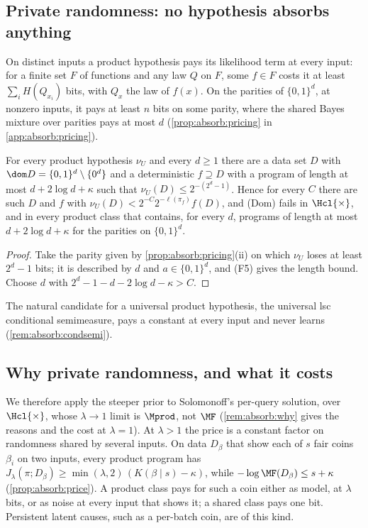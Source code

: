 \subsection{Private randomness: no hypothesis absorbs anything}\label{sec:absorb:private}

On distinct inputs a product hypothesis pays its likelihood term at every input: for a finite set $F$ of functions and any law $Q$ on $F$, some $f\in F$ costs it at least $\sum_iH(Q_{x_i})$ bits, with $Q_x$ the law of $f(x)$. On the parities of $\{0,1\}^d$, at nonzero inputs, it pays at least $n$ bits on some parity, where the shared Bayes mixture over parities pays at most $d$ (\cref{prop:absorb:pricing} in \cref{app:absorb:pricing}).

\begin{corollary}\label{cor:absorb:nouniversal}
For every product hypothesis $\nu_U$ and every $d\ge1$ there are a data set $D$ with $\dom D=\{0,1\}^d\setminus\{0^d\}$ and a deterministic $f\supseteq D$ with a program of length at most $d+2\log d+\kappa$ such that $\nu_U(D)\le2^{-(2^d-1)}$. Hence for every $C$ there are such $D$ and $f$ with $\nu_U(D)<2^{-C}2^{-\ell(\pi_f)}f(D)$, and (Dom) fails in $\Hcl{\times}$, and in every product class that contains, for every $d$, programs of length at most $d+2\log d+\kappa$ for the parities on $\{0,1\}^d$.
\end{corollary}

\begin{proof}
Take the parity given by \cref{prop:absorb:pricing}(ii) on which $\nu_U$ loses at least $2^d-1$ bits; it is described by $d$ and $a\in\{0,1\}^d$, and (F5) gives the length bound. Choose $d$ with $2^d-1-d-2\log d-\kappa>C$.
\end{proof}

The natural candidate for a universal product hypothesis, the universal lsc conditional semimeasure, pays a constant at every input and never learns (\cref{rem:absorb:condsemi}).

\subsection{Why private randomness, and what it costs}\label{sec:absorb:price}

We therefore apply the steeper prior to Solomonoff's per-query solution, over $\Hcl{\times}$, whose $\lambda\to1$ limit is $\Mprod$, not $\MF$ (\cref{rem:absorb:why} gives the reasons and the cost at $\lambda=1$). At $\lambda>1$ the price is a constant factor on randomness shared by several inputs. On data $D_\beta$ that show each of $s$ fair coins $\beta_i$ on two inputs, every product program has $J_\lambda(\pi;D_\beta)\ge\min(\lambda,2)\,(K(\beta\mid s)-\kappa)$, while $-\log\MF(D_\beta)\le s+\kappa$ (\cref{prop:absorb:price}). A product class pays for such a coin either as model, at $\lambda$ bits, or as noise at every input that shows it; a shared class pays one bit. Persistent latent causes, such as a per-batch coin, are of this kind.

